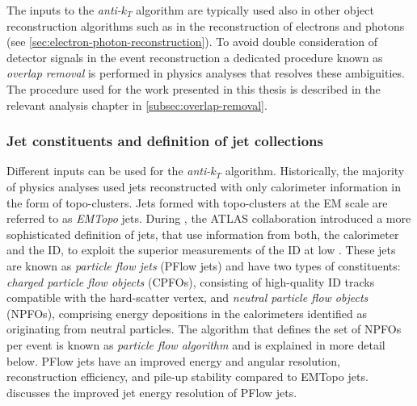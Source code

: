 The inputs to the \emph{anti-$k_T$} algorithm are typically used also in other object reconstruction algorithms such as in the reconstruction of electrons and photons (see \cref{sec:electron-photon-reconstruction}).
To avoid double consideration of detector signals in the event reconstruction a dedicated procedure known as \emph{overlap removal} is performed in physics analyses that resolves these ambiguities. The procedure used for the work presented in this thesis is described in the relevant analysis chapter in \cref{subsec:overlap-removal}.


\subsubsection{Jet constituents and definition of jet collections}
Different inputs can be used for the \emph{anti-$k_T$} algorithm.
Historically, the majority of physics analyses used jets reconstructed with only calorimeter information in the form of topo-clusters. Jets formed with topo-clusters at the EM scale are referred to as \emph{EMTopo} jets.
During \RunTwo, the ATLAS collaboration introduced a more sophisticated definition of jets, that use information from both, the calorimeter and the ID, to exploit the superior measurements of the ID at low \pT.
These jets are known as \emph{particle flow jets} (PFlow jets) and have two types of constituents: \emph{charged particle flow objects} (CPFOs), consisting of high-quality ID tracks compatible with the hard-scatter vertex, and \emph{neutral particle flow objects} (NPFOs), comprising energy depositions in the calorimeters identified as originating from neutral particles. The algorithm that defines the set of NPFOs per event is known as \emph{particle flow algorithm} and is explained in more detail below.
PFlow jets have an improved energy and angular resolution, reconstruction efficiency, and pile-up stability compared to EMTopo jets\cite{PERF-2015-09}.
 discusses the improved jet energy resolution of PFlow jets.


